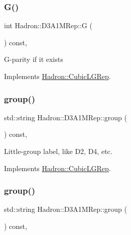 \subsubsection{\texorpdfstring{G()}{G()}\hspace{0.1cm}{\footnotesize\ttfamily [2/2]}}
{\footnotesize\ttfamily int Hadron\+::\+D3\+A1\+M\+Rep\+::G (\begin{DoxyParamCaption}{ }\end{DoxyParamCaption}) const\hspace{0.3cm}{\ttfamily [inline]}, {\ttfamily [virtual]}}

G-\/parity if it exists 

Implements \mbox{\hyperlink{structHadron_1_1CubicLGRep_ace26f7b2d55e3a668a14cb9026da5231}{Hadron\+::\+Cubic\+L\+G\+Rep}}.

\mbox{\label{structHadron_1_1D3A1MRep_a900d5acc0d3ed9cf5f3f97537f43d8e7}} 
\subsubsection{\texorpdfstring{group()}{group()}\hspace{0.1cm}{\footnotesize\ttfamily [1/2]}}
{\footnotesize\ttfamily std\+::string Hadron\+::\+D3\+A1\+M\+Rep\+::group (\begin{DoxyParamCaption}{ }\end{DoxyParamCaption}) const\hspace{0.3cm}{\ttfamily [inline]}, {\ttfamily [virtual]}}

Little-\/group label, like D2, D4, etc. 

Implements \mbox{\hyperlink{structHadron_1_1CubicLGRep_a9bdb14b519a611d21379ed96a3a9eb41}{Hadron\+::\+Cubic\+L\+G\+Rep}}.

\mbox{\label{structHadron_1_1D3A1MRep_a900d5acc0d3ed9cf5f3f97537f43d8e7}} 
\subsubsection{\texorpdfstring{group()}{group()}\hspace{0.1cm}{\footnotesize\ttfamily [2/2]}}
{\footnotesize\ttfamily std\+::string Hadron\+::\+D3\+A1\+M\+Rep\+::group (\begin{DoxyParamCaption}{ }\end{DoxyParamCaption}) const\hspace{0.3cm}{\ttfamily [inline]}, {\ttfamily [virtual]}}

